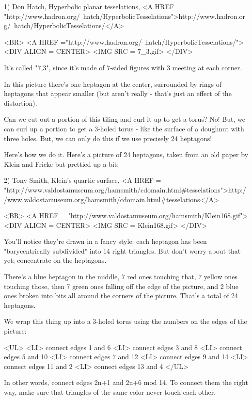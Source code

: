 1) Don Hatch, Hyperbolic planar tesselations,
<A HREF = "http://www.hadron.org/~hatch/HyperbolicTesselations">http://www.hadron.org/~hatch/HyperbolicTesselations/</A>

<BR>
<A HREF ="http://www.hadron.org/~hatch/HyperbolicTesselations/">
<DIV ALIGN = CENTER>
<IMG SRC = 7_3.gif>
</DIV>


It's called "{7,3}", since it's made of 7-sided figures with 3 
meeting at each corner.  

In this picture there's one heptagon at the center, surrounded by 
rings of heptagons that appear smaller (but aren't really - that's
just an effect of the distortion).  

Can we cut out a portion of this tiling and curl it up to get
a torus?  No!  But, we can curl up a portion to get a 3-holed
torus - like the surface of a doughnut with three holes.  But, 
we can only do this if we use precisely 24 heptagons!

Here's how we do it.  Here's a picture of 24 heptagons, taken
from an old paper by Klein and Fricke but prettied up a bit:

2) Tony Smith, Klein's quartic surface,
<A HREF = "http://www.valdostamuseum.org/hamsmith/cdomain.html#tesselations">http://www.valdostamuseum.org/hamsmith/cdomain.html#tesselations</A>

<BR>
<A HREF = "http://www.valdostamuseum.org/hamsmith/Klein168.gif">
<DIV ALIGN = CENTER>
<IMG SRC = Klein168.gif>
</DIV>


You'll notice they're drawn in a fancy style: each heptagon has 
been "barycentrically subdivided" into 14 right triangles.  
But don't worry about that yet; concentrate on the heptagons.

There's a blue heptagon in the middle, 7 red ones touching that,
7 yellow ones touching those, then 7 green ones falling off the 
edge of the picture, and 2 blue ones broken into bits all around 
the corners of the picture.  That's a total of 24 heptagons.

We wrap this thing up into a 3-holed torus using the numbers on 
the edges of the picture:

<UL>
<LI>
connect edges 1 and 6
<LI>
connect edges 3 and 8 
<LI>
connect edges 5 and 10
<LI>
connect edges 7 and 12
<LI>
connect edges 9 and 14
<LI>
connect edges 11 and 2
<LI>
connect edges 13 and 4
</UL>

In other words, connect edges 2n+1 and 2n+6 mod 14.
To connect them the right way, make sure that triangles
of the same color never touch each other.

